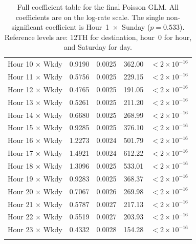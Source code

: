 \documentclass[11pt, letterpaper]{article}
\begin{document}
\begin{longtable}{lrrrr}
Hour 10 $\times$ Wkdy &  0.9190 & 0.0025 &  362.00 & $<2\times10^{-16}$ \\
Hour 11 $\times$ Wkdy &  0.5756 & 0.0025 &  229.15 & $<2\times10^{-16}$ \\
Hour 12 $\times$ Wkdy &  0.4765 & 0.0025 &  191.05 & $<2\times10^{-16}$ \\
Hour 13 $\times$ Wkdy &  0.5261 & 0.0025 &  211.20 & $<2\times10^{-16}$ \\
Hour 14 $\times$ Wkdy &  0.6680 & 0.0025 &  268.99 & $<2\times10^{-16}$ \\
Hour 15 $\times$ Wkdy &  0.9285 & 0.0025 &  376.10 & $<2\times10^{-16}$ \\
Hour 16 $\times$ Wkdy &  1.2273 & 0.0024 &  501.79 & $<2\times10^{-16}$ \\
Hour 17 $\times$ Wkdy &  1.4921 & 0.0024 &  612.22 & $<2\times10^{-16}$ \\
Hour 18 $\times$ Wkdy &  1.3096 & 0.0025 &  533.01 & $<2\times10^{-16}$ \\
Hour 19 $\times$ Wkdy &  0.9283 & 0.0025 &  368.37 & $<2\times10^{-16}$ \\
Hour 20 $\times$ Wkdy &  0.7067 & 0.0026 &  269.98 & $<2\times10^{-16}$ \\
Hour 21 $\times$ Wkdy &  0.5787 & 0.0027 &  217.13 & $<2\times10^{-16}$ \\
Hour 22 $\times$ Wkdy &  0.5519 & 0.0027 &  203.93 & $<2\times10^{-16}$ \\
Hour 23 $\times$ Wkdy &  0.4332 & 0.0028 &  154.28 & $<2\times10^{-16}$ \\
\hline
\caption{Full coefficient table for the final Poisson GLM. All coefficients are on the log-rate scale. The single non-significant coefficient is Hour~1~$\times$~Sunday ($p = 0.533$). Reference levels are: 12TH for destination, hour~0 for hour, and Saturday for day.}
\label{tab:full_coefs}
\end{longtable}
\end{document}
